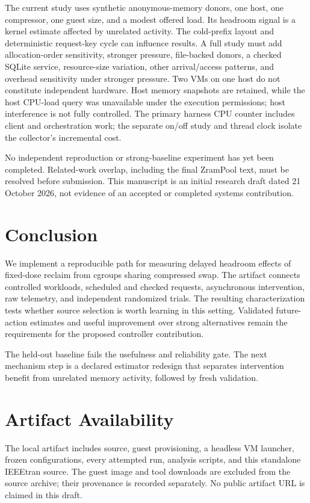 \documentclass[conference]{IEEEtran}
\begin{document}
The current study uses synthetic anonymous-memory donors, one host, one
compressor, one guest size, and a modest offered load. Its headroom signal is a
kernel estimate affected by unrelated activity. The cold-prefix layout and
deterministic request-key cycle can influence results. A full study must add
allocation-order sensitivity, stronger pressure, file-backed donors, a checked
SQLite service, resource-size variation, other arrival/access patterns, and overhead sensitivity under stronger
pressure. Two VMs on one host do not constitute independent hardware. Host memory
snapshots are retained, while the host CPU-load query was unavailable under
the execution permissions; host interference is not fully controlled. The primary harness CPU counter includes client and orchestration work; the
separate on/off study and thread clock isolate the collector's incremental cost.

No independent reproduction or strong-baseline experiment has yet been
completed. Related-work overlap, including the final ZramPool text, must be
resolved before submission. This manuscript is an initial research draft dated
21 October 2026, not evidence of an accepted or completed systems contribution.

\section{Conclusion}
We implement a reproducible path for measuring delayed headroom effects of
fixed-dose reclaim from cgroups sharing compressed swap. The artifact connects
controlled workloads, scheduled and checked requests, asynchronous intervention,
raw telemetry, and independent randomized trials. The resulting characterization
tests whether source selection is worth learning in this setting. Validated
future-action estimates and useful improvement over strong alternatives remain
the requirements for the proposed controller contribution.

The held-out baseline fails the usefulness and reliability gate. The next mechanism step is a declared estimator redesign that separates intervention benefit from unrelated memory activity, followed by fresh validation.

\section*{Artifact Availability}
The local artifact includes source, guest provisioning, a headless VM launcher,
frozen configurations, every attempted run, analysis scripts, and this standalone
IEEEtran source. The guest image and tool downloads are excluded from the source
archive; their provenance is recorded separately. No public artifact URL is
claimed in this draft.
\end{document}
